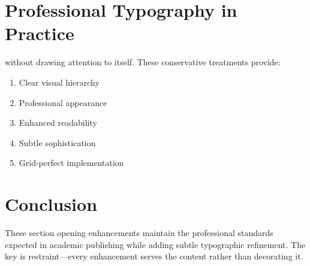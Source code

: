 \documentclass[11pt]{article}
\begin{document}
\section{Professional Typography in Practice}

 without drawing attention to itself. These conservative treatments provide:

\begin{enumerate}
\item Clear visual hierarchy
\item Professional appearance
\item Enhanced readability
\item Subtle sophistication
\item Grid-perfect implementation
\end{enumerate}

\lipsum[7]

\majorsectionspace

\section{Conclusion}

These section opening enhancements maintain the professional standards expected in academic publishing while adding subtle typographic refinement. The key is restraint—every enhancement serves the content rather than decorating it.
\end{document}
